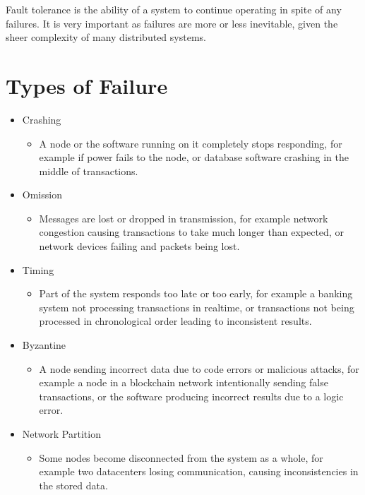 
Fault tolerance is the ability of a system to continue operating in spite of any failures. It is very important as failures are more or less inevitable, given the sheer complexity of many distributed systems.

\section*{Types of Failure}

\begin{itemize}
  \item Crashing
  \begin{itemize}
    \item A node or the software running on it completely stops responding, for example if power fails to the node, or database software crashing in the middle of transactions.
  \end{itemize}
  \item Omission
  \begin{itemize}
    \item Messages are lost or dropped in transmission, for example network congestion causing transactions to take much longer than expected, or network devices failing and packets being lost.
  \end{itemize}
  \item Timing
  \begin{itemize}
    \item Part of the system responds too late or too early, for example a banking system not processing transactions in realtime, or transactions not being processed in chronological order leading to inconsistent results.
  \end{itemize}
  \item Byzantine
  \begin{itemize}
    \item A node sending incorrect data due to code errors or malicious attacks, for example a node in a blockchain network intentionally sending false transactions, or the software producing incorrect results due to a logic error.
  \end{itemize}
  \item Network Partition
  \begin{itemize}
    \item Some nodes become disconnected from the system as a whole, for example two datacenters losing communication, causing inconsistencies in the stored data.
  \end{itemize}
\end{itemize}

